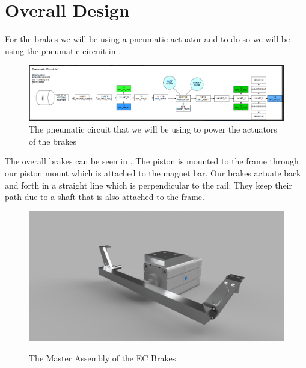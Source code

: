\documentclass[main.tex]{subfiles}
\begin{document}
    \section{Overall Design}
    For the brakes we will be using a pneumatic actuator and to do so we will be using the pneumatic circuit in . \\
    \begin{figure}[H]
        \centering
        \includegraphics[width=\linewidth]{images/EC_Pnuematic_Circuit.png}
        \caption{The pneumatic circuit that we will be using to power the actuators of the brakes}
        \label{fig:pneumatic-circuit}
    \end{figure}
    The overall brakes can be seen in . The piston is mounted to the frame through our piston mount which is attached to the magnet bar. Our brakes actuate back and forth in a straight line which is perpendicular to the rail. They keep their path due to a shaft that is also attached to the frame.
    \begin{figure}[H]
    	\centering
        \includegraphics[width =\linewidth]{images/EC_Brake_Master_2018}
        \label{fig:EC-Assembly}
        \caption{The Master Assembly of the EC Brakes}
    \end{figure}
    
\end{document}
